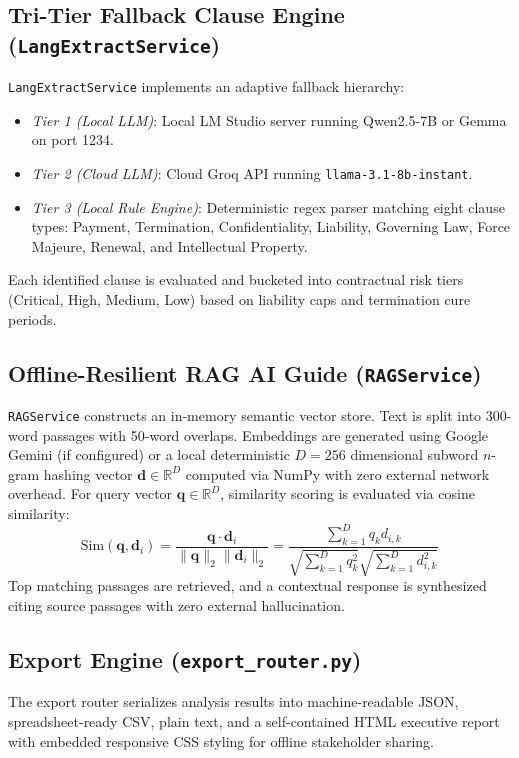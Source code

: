 \documentclass[conference]{IEEEtran}
\begin{document}
\subsection{Tri-Tier Fallback Clause Engine (\texttt{LangExtractService})}
\texttt{LangExtractService} implements an adaptive fallback hierarchy:
\begin{itemize}
    \item \textit{Tier 1 (Local LLM)}: Local LM Studio server running Qwen2.5-7B or Gemma on port 1234.
    \item \textit{Tier 2 (Cloud LLM)}: Cloud Groq API running \texttt{llama-3.1-8b-instant}.
    \item \textit{Tier 3 (Local Rule Engine)}: Deterministic regex parser matching eight clause types: Payment, Termination, Confidentiality, Liability, Governing Law, Force Majeure, Renewal, and Intellectual Property.
\end{itemize}
Each identified clause is evaluated and bucketed into contractual risk tiers (Critical, High, Medium, Low) based on liability caps and termination cure periods.

\subsection{Offline-Resilient RAG AI Guide (\texttt{RAGService})}
\texttt{RAGService} constructs an in-memory semantic vector store. Text is split into 300-word passages with 50-word overlaps. Embeddings are generated using Google Gemini (if configured) or a local deterministic $D=256$ dimensional subword $n$-gram hashing vector $\mathbf{d} \in \mathbb{R}^D$ computed via NumPy with zero external network overhead. For query vector $\mathbf{q} \in \mathbb{R}^D$, similarity scoring is evaluated via cosine similarity:
\begin{equation}
\text{Sim}(\mathbf{q}, \mathbf{d}_i) = \frac{\mathbf{q} \cdot \mathbf{d}_i}{\|\mathbf{q}\|_2 \|\mathbf{d}_i\|_2} = \frac{\sum_{k=1}^{D} q_k d_{i,k}}{\sqrt{\sum_{k=1}^{D} q_k^2} \sqrt{\sum_{k=1}^{D} d_{i,k}^2}}
\label{eq_cosine}
\end{equation}
Top matching passages are retrieved, and a contextual response is synthesized citing source passages with zero external hallucination.

\subsection{Export Engine (\texttt{export\_router.py})}
The export router serializes analysis results into machine-readable JSON, spreadsheet-ready CSV, plain text, and a self-contained HTML executive report with embedded responsive CSS styling for offline stakeholder sharing.
\end{document}
